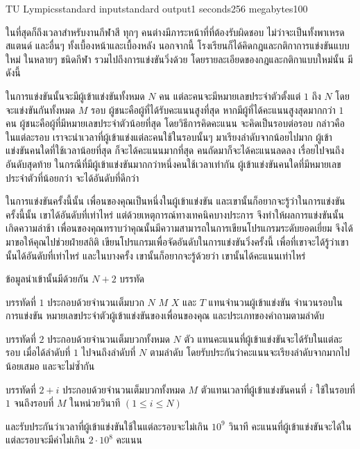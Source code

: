 \documentclass[11pt,a4paper]{article}
\begin{document}
\begin{problem}{TU Lympics}{standard input}{standard output}{1 seconds}{256 megabytes}{100}

ในที่สุดก็ถึงเวลาสำหรับงานกีฬาสี ทุกๆ คนต่างมีภาระหน้าที่ที่ต้องรับผิดชอบ ไม่ว่าจะเป็นทั้งพาเหรด สแตนด์ และอื่นๆ ทั้งเบื้องหน้าและเบื้องหลัง นอกจากนี้ โรงเรียนก็ได้คิดกฎและกติกาการแข่งขันแบบใหม่ ในหลายๆ ชนิดกีฬา รวมไปถึงการแข่งขันวิ่งด้วย โดยรายละเอียดของกฎและกติกาแบบใหม่นั้น มีดังนี้

ในการแข่งขันนั้นจะมีผู้เข้าแข่งขันทั้งหมด $N$ คน แต่ละคนจะมีหมายเลขประจำตัวตั้งแต่ $1$ ถึง $N$ โดยจะแข่งขันกันทั้งหมด $M$ รอบ ผู้ชนะคือผู้ที่ได้รับคะแนนสูงที่สุด หากมีผู้ที่ได้คะแนนสูงสุดมากกว่า $1$ คน ผู้ชนะคือผู้ที่มีหมายเลขประจำตัวน้อยที่สุด โดยวิธีการคิดคะแนน จะคิดเป็นรอบต่อรอบ กล่าวคือ ในแต่ละรอบ เราจะนำเวลาที่ผู้เข้าแข่งแต่ละคนใช้ในรอบนั้นๆ มาเรียงลำดับจากน้อยไปมาก ผู้เข้าแข่งขันคนใดที่ใช้เวลาน้อยที่สุด ก็จะได้คะแนนมากที่สุด คนถัดมาก็จะได้คะแนนลดลง เรื่อยไปจนถึงอันดับสุดท้าย ในกรณีที่มีผู้เข้าแข่งขันมากกว่าหนึ่งคนใช้เวลาเท่ากัน ผู้เข้าแข่งขันคนใดที่มีหมายเลขประจำตัวที่น้อยกว่า จะได้อันดับที่ดีกว่า

ในการแข่งขันครั้งนี้นั้น เพื่อนของคุณเป็นหนึ่งในผู้เข้าแข่งขัน และเขานั้นก็อยากจะรู้ว่าในการแข่งขันครั้งนี้นั้น เขาได้อันดับที่เท่าไหร่ แต่ด้วยเหตุการณ์ทางเทคนิคบางประการ จึงทำให้ผลการแข่งขันนั้นเกิดความล่าช้า เพื่อนของคุณทราบว่าคุณนั้นมีความสามารถในการเขียนโปรแกรมระดับยอดเยี่ยม จึงได้มาขอให้คุณไปช่วยฝ่ายสถิติ เขียนโปรแกรมเพื่อจัดอันดับในการแข่งขันวิ่งครั้งนี้ เพื่อที่เขาจะได้รู้ว่าเขานั้นได้อันดับที่เท่าไหร่ และในบางครั้ง เขานั้นก็อยากจะรู้ด้วยว่า เขานั้นได้คะแนนเท่าไหร่ 

\InputFile
ข้อมูลนำเข้านั้นมีด้วยกัน $N+2$ บรรทัด 

บรรทัดที่ $1$ ประกอบด้วยจำนวนเต็มบวก $N$ $M$ $X$ และ $T$ แทนจำนวนผู้เข้าแข่งขัน จำนวนรอบในการแข่งขัน หมายเลขประจำตัวผู้เข้าแข่งขันของเพื่อนของคุณ และประเภทของคำถามตามลำดับ
	
บรรทัดที่ $2$ ประกอบด้วยจำนวนเต็มบวกทั้งหมด $N$ ตัว แทนคะแนนที่ผู้เข้าแข่งขันจะได้รับในแต่ละรอบ เมื่อได้ลำดับที่ $1$ ไปจนถึงลำดับที่ $N$ ตามลำดับ โดยรับประกันว่าคะแนนจะเรียงลำดับจากมากไปน้อยเสมอ และจะไม่ซ้ำกัน

บรรทัดที่ $2+i$ ประกอบด้วยจำนวนเต็มบวกทั้งหมด $M$ ตัวแทนเวลาที่ผู้เข้าแข่งขันคนที่ $i$ ใช้ในรอบที่ $1$ จนถึงรอบที่ $M$ ในหน่วยวินาที  $(1 \leq i \leq N )$ 

และรับประกันว่าเวลาที่ผู้เข้าแข่งขันใช้ในแต่ละรอบจะไม่เกิน $10^9$ วินาที คะแนนที่ผู้เข้าแข่งขันจะได้ในแต่ละรอบจะมีค่าไม่เกิน $2 \cdot 10^8$ คะแนน


\end{problem}
\end{document}
